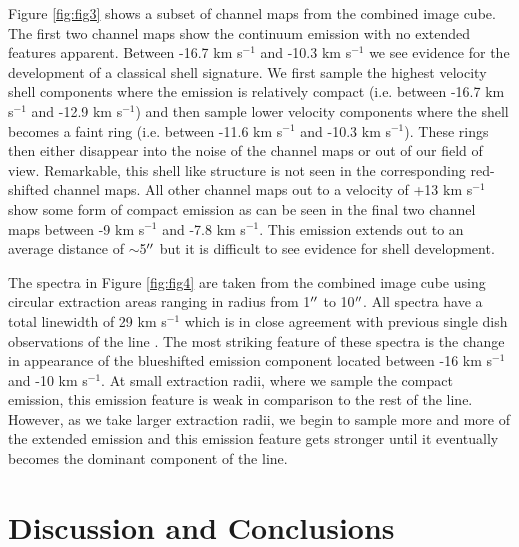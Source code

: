 \documentclass[manuscript]{aastex}
\begin{document}
Figure \ref{fig:fig3} shows a subset of channel maps from the combined image cube. The first two channel maps show the continuum emission with no extended features apparent. Between -16.7 km s${}^{-1}$ and -10.3 km s${}^{-1}$ we see evidence for the development of a classical shell signature. We first sample the highest velocity shell components where the emission is relatively compact (i.e. between -16.7 km s${}^{-1}$ and -12.9 km s${}^{-1}$) and then sample lower velocity components where the shell becomes a faint ring (i.e. between -11.6 km s${}^{-1}$ and -10.3 km s${}^{-1}$). These rings then either disappear into the noise of the channel maps or out of our field of view. Remarkable, this shell like structure is not seen in the corresponding red-shifted channel maps. All other channel maps out to a velocity of +13 km s${}^{-1}$ show some form of compact emission as can be seen in the final two channel maps between -9 km s${}^{-1}$ and -7.8 km s${}^{-1}$. This emission extends out to an average distance of $\sim$5$\mbox{$^{\prime\prime}$}$ but it is difficult to see evidence for shell development. 

The spectra in Figure \ref{fig:fig4} are taken from the combined image cube using circular extraction areas ranging in radius from 1$\mbox{$^{\prime\prime}$}$ to 10$\mbox{$^{\prime\prime}$}$. All spectra have a total linewidth of 29 km s${}^{-1}$ which is in close agreement with previous single dish observations of the line \citep{knap80, hugg86, hugg94}. The most striking feature of these spectra is the change in appearance of the blueshifted emission component located between -16 km s${}^{-1}$ and -10 km s${}^{-1}$.  At small extraction radii, where we sample the compact emission, this emission feature is weak in comparison to the rest of the line. However, as we take larger extraction radii, we begin to sample more and more of the extended emission and this emission feature gets stronger until it eventually becomes the dominant component of the line. 

\section{Discussion and Conclusions}
\end{document}
